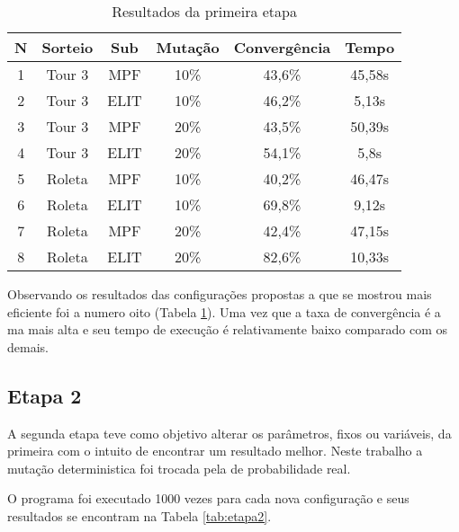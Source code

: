 \documentclass[a4paper, 12pt]{article}
\begin{document}
    \begin{table}[h]
      \centering
      \begin{tabular}{|c|c|c|c|c|c|}
        \hline
        N & Sorteio & Sub & Mutação & Convergência & Tempo \\
        \hline
        1 & Tour 3 & MPF & 10\% & 43,6\% & 45,58s \\
        \hline
        2 & Tour 3 & ELIT & 10\% & 46,2\% & 5,13s \\
        \hline
        3 & Tour 3 & MPF & 20\% & 43,5\% & 50,39s \\
        \hline
        4 & Tour 3 & ELIT & 20\% & 54,1\% & 5,8s \\
        \hline
        5 & Roleta & MPF & 10\% & 40,2\% & 46,47s \\
        \hline
        6 & Roleta & ELIT & 10\% & 69,8\% & 9,12s \\
        \hline
        7 & Roleta & MPF & 20\% & 42,4\% & 47,15s \\
        \hline
        8 & Roleta & ELIT & 20\% & 82,6\% & 10,33s \\
        \hline
      \end{tabular}
      \caption{Resultados da primeira etapa}
      \label{tab:etapa1}
    \end{table}

  Observando os resultados das configurações propostas a que se mostrou mais
  eficiente foi a numero oito (Tabela \ref{tab:etapa1}). Uma vez que a taxa de convergência é a
  ma mais alta e seu tempo de execução é relativamente baixo comparado com os demais.

  \subsection{Etapa 2}
  A segunda etapa teve como objetivo alterar os parâmetros, fixos ou variáveis,
  da primeira com o intuito de encontrar um resultado melhor. Neste trabalho
  a mutação deterministica foi trocada pela de probabilidade real.

  O programa foi executado 1000 vezes para cada nova configuração
  e seus resultados se encontram na Tabela \ref{tab:etapa2}.
\end{document}
